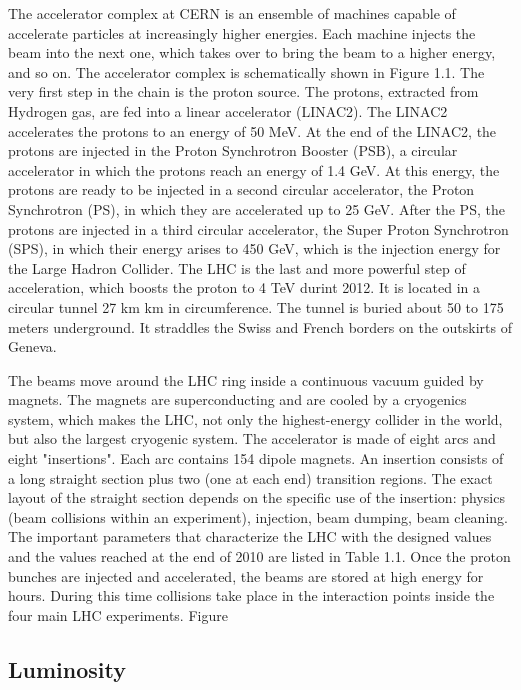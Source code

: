 The accelerator complex at CERN is an ensemble of machines capable of accelerate particles
at increasingly higher energies. Each machine injects the beam into the next one, which takes over to bring the beam to a higher energy, and so on. The accelerator complex
is schematically shown in Figure 1.1. The very first step in the chain is the proton source. The protons, extracted from Hydrogen gas, are fed into a linear accelerator (LINAC2). The LINAC2 accelerates the protons to an energy of 50 MeV. At the end of the LINAC2, the protons are injected in the Proton Synchrotron Booster (PSB), a circular accelerator in which the protons reach an energy of 1.4 GeV. At this energy, the protons are ready to be injected in a second circular accelerator,
the Proton Synchrotron (PS), in which they are accelerated up to 25 GeV. After the PS, the
protons are injected in a third circular accelerator, the Super Proton Synchrotron (SPS), in
which their energy arises to 450 GeV, which is the injection energy for the Large Hadron
Collider. The LHC is the last and more powerful step of acceleration, which boosts the proton to
4 TeV durint 2012. It is located in a circular tunnel 27 km km in circumference. The tunnel is buried about
50 to 175 meters underground. It straddles the Swiss and French borders on the outskirts
of Geneva.

The beams move around the LHC ring inside a continuous vacuum guided by magnets.
The magnets are superconducting and are cooled by a cryogenics system, which makes
the LHC, not only the highest-energy collider in the world, but also the largest cryogenic
system.
The accelerator is made of eight arcs and eight "insertions". Each arc contains 154
dipole magnets. An insertion consists of a long straight section plus two (one at each end)
transition regions. The exact layout of the straight section depends on the specific use of
the insertion: physics (beam collisions within an experiment), injection, beam dumping,
beam cleaning. The important parameters that characterize the LHC with the designed
values and the values reached at the end of 2010 are listed in Table 1.1.
Once the proton bunches are injected and accelerated, the beams are stored at high
energy for hours. During this time collisions take place in the interaction points inside the
four main LHC experiments.
Figure





\subsection{Luminosity}

